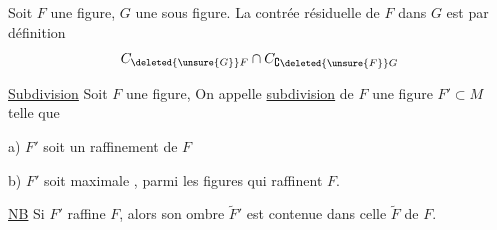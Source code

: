  Soit $F$ une figure, $G$ une  sous figure. La contrée résiduelle de $F$ dans $G$ est par définition
\[
 C_{\deleted{\unsure{G}}F}\cap C_{\complement\deleted{\unsure{F}}G}
\]

\uline{Subdivision} Soit $F$  une figure,  On appelle \uline{subdivision} de $F$ une figure $F'\subset M$ telle que

a) $F'$ soit un raffinement de $F$

b) $F'$ soit maximale , parmi les  figures qui raffinent $F$.

\uline{NB} Si $F'$ raffine $F$, alors son ombre $\widetilde F'$ est contenue dans celle $\widetilde F$ de $F$.
